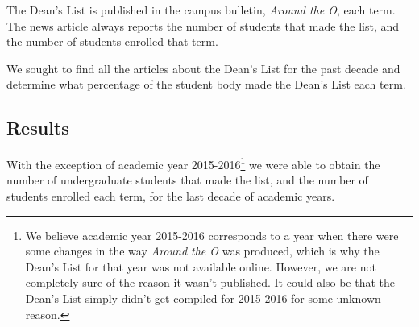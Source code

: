 \documentclass[10pt]{article}
\begin{document}
The Dean's List is published in the campus bulletin, \textit{Around the O}, each term. The news article always reports the number of students that made the list, and the number of students enrolled that term.

We sought to find all the articles about the Dean's List for the past decade and determine what percentage of the student body made the Dean's List each term.


\subsection{Results}

With the exception of academic year 2015-2016\footnote{We believe academic year 2015-2016 corresponds to a year when there were some changes in the way \textit{Around the O} was produced, which is why the Dean's List for that year was not available online. However, we are not completely sure of the reason it wasn't published. It could also be that the Dean's List simply didn't get compiled for 2015-2016 for some unknown reason.} we were able to obtain the number of undergraduate students that made the list, and the number of students enrolled each term, for the last decade of academic years. 
\end{document}
